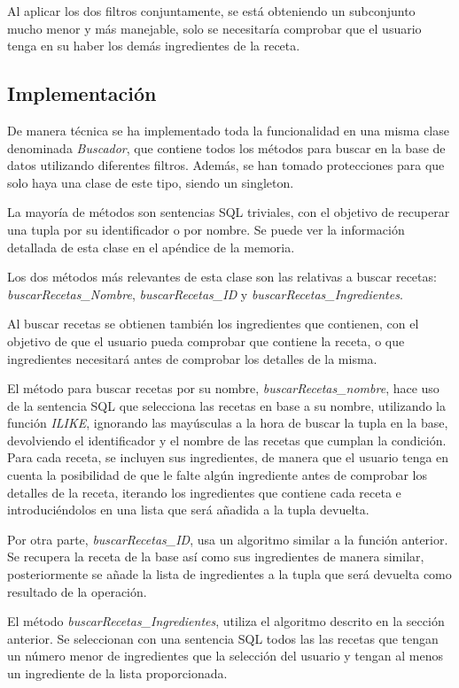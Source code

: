 Al aplicar los dos filtros conjuntamente, se está obteniendo un subconjunto mucho menor y más manejable, solo se necesitaría comprobar que el usuario tenga en su haber los demás ingredientes de la receta.

\subsection{Implementación}
De manera técnica se ha implementado toda la funcionalidad en una misma clase denominada \textit{Buscador}, que contiene todos los métodos para buscar en la base de datos utilizando diferentes filtros. Además, se han tomado protecciones para que solo haya una clase de este tipo, siendo un \gls{singleton}. 

La mayoría de métodos son sentencias \gls{SQL} triviales, con el objetivo de recuperar una \gls{tupla} por su identificador o por nombre. Se puede ver la información detallada de esta clase en el apéndice de la memoria.

Los dos métodos más relevantes de esta clase son las relativas a buscar recetas: \textit{buscarRecetas\_Nombre}, \textit{buscarRecetas\_ID} y \textit{buscarRecetas\_Ingredientes}.

Al buscar recetas se obtienen también los ingredientes que contienen, con el objetivo de que el usuario pueda comprobar que contiene la receta, o que ingredientes necesitará antes de comprobar los detalles de la misma.

El método para buscar recetas por su nombre, \textit{buscarRecetas\_nombre}, hace uso de la sentencia \gls{SQL} que selecciona las recetas en base a su nombre, utilizando la función \textit{ILIKE},  ignorando las mayúsculas a la hora de buscar la \gls{tupla} en la \gls{base}, devolviendo el identificador y el nombre de las recetas que cumplan la condición.
Para cada receta, se incluyen sus ingredientes, de manera que el usuario tenga en cuenta la posibilidad de que le falte algún ingrediente antes de comprobar los detalles de la receta, iterando los ingredientes que contiene cada receta e introduciéndolos en una lista que será añadida a la \gls{tupla} devuelta.

Por otra parte, \textit{buscarRecetas\_ID}, usa un algoritmo similar a la función anterior. Se recupera la receta de la \gls{base} así como sus ingredientes de manera similar, posteriormente se añade la lista de ingredientes a la \gls{tupla} que será devuelta como resultado de la operación. 

El método \textit{buscarRecetas\_Ingredientes}, utiliza el algoritmo descrito en la sección anterior. Se seleccionan con una sentencia \gls{SQL} todos las las recetas que tengan un número menor de ingredientes que la selección del usuario y tengan al menos un ingrediente de la lista proporcionada. 

